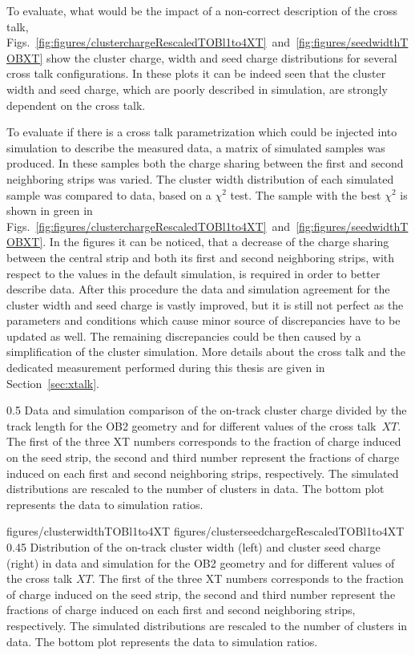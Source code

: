 To evaluate, what would be the impact of a non-correct description of the cross talk, Figs.~\ref{fig:figures/clusterchargeRescaledTOBl1to4XT}~and~\ref{fig:figures/seedwidthTOBXT} show the cluster charge, width and seed charge distributions for several cross talk configurations. In these plots it can be indeed seen that the cluster width and seed charge, which are poorly described in simulation, are strongly dependent on the cross talk. 

To evaluate if there is a cross talk parametrization which could be injected into simulation to describe the measured data, a matrix of simulated samples was produced. In these samples both the charge sharing between the first and second neighboring strips was varied. The cluster width distribution of each simulated sample was compared to data, based on a $\chi^{2}$ test. The sample with the best $\chi^{2}$ is shown in green in Figs.~\ref{fig:figures/clusterchargeRescaledTOBl1to4XT}~and~\ref{fig:figures/seedwidthTOBXT}. In the figures it can be noticed, that a decrease of the charge sharing between the central strip and both its first and second neighboring strips, with respect to the values in the default simulation, is required in order to better describe data. After this procedure the data and simulation agreement for the cluster width and seed charge is vastly improved, but it is still not perfect as the parameters and conditions which cause minor source of discrepancies have to be updated as well. The remaining discrepancies could be then caused by a simplification of the cluster simulation. More details about the cross talk and the dedicated measurement performed during this thesis are given in Section~\ref{sec:xtalk}.


                 {0.5}       %
                 { Data and simulation comparison of the on-track cluster charge divided by the track length for the OB2 geometry and for different values of the cross talk~$XT$. The first of the three XT numbers corresponds to the fraction of charge induced on the seed strip, the second and third number represent the fractions of charge induced on each first and second neighboring strips, respectively. The simulated distributions are rescaled to the number of clusters in data. The bottom plot represents the data to simulation ratios.}

                 {figures/clusterwidthTOBl1to4XT}
                 {figures/clusterseedchargeRescaledTOBl1to4XT} %
                 {0.45}       %
                 { Distribution of the on-track cluster width (left) and cluster seed charge (right) in data and simulation for the OB2 geometry and for different values of the cross talk $XT$. The first of the three XT numbers corresponds to the fraction of charge induced on the seed strip, the second and third number represent the fractions of charge induced on each first and second neighboring strips, respectively. The simulated distributions are rescaled to the number of clusters in data. The bottom plot represents the data to simulation ratios. } 


